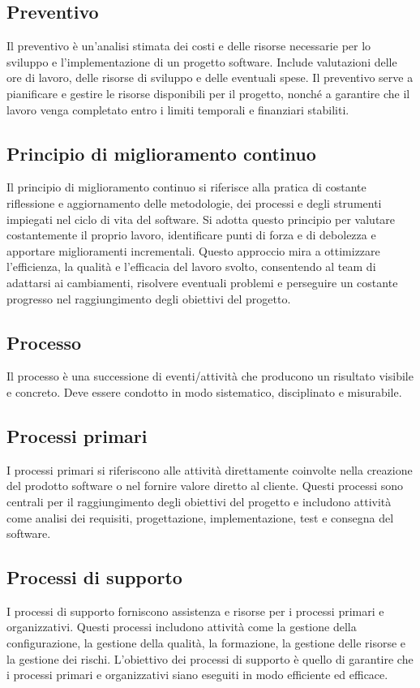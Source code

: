 \subsection*{Preventivo} 
Il preventivo è un'analisi stimata dei costi e delle risorse necessarie per lo sviluppo e l'implementazione di un progetto software. Include valutazioni delle ore di lavoro, delle risorse di sviluppo e delle eventuali spese. Il preventivo serve a pianificare e gestire le risorse disponibili per il progetto, nonché a garantire che il lavoro venga completato entro i limiti temporali e finanziari stabiliti. 
\subsection*{Principio di miglioramento continuo} 
Il principio di miglioramento continuo si riferisce alla pratica di costante riflessione e aggiornamento delle metodologie, dei processi e degli strumenti impiegati nel ciclo di vita del software. Si adotta questo principio per valutare costantemente il proprio lavoro, identificare punti di forza e di debolezza e apportare miglioramenti incrementali. Questo approccio mira a ottimizzare l'efficienza, la qualità e l'efficacia del lavoro svolto, consentendo al team di adattarsi ai cambiamenti, risolvere eventuali problemi e perseguire un costante progresso nel raggiungimento degli obiettivi del progetto. 
\subsection*{Processo} 
Il processo è una successione di eventi/attività che producono un risultato visibile e concreto. Deve essere condotto in modo sistematico, disciplinato e misurabile.
\subsection*{Processi primari} 
I processi primari si riferiscono alle attività direttamente coinvolte nella creazione del prodotto software o nel fornire valore diretto al cliente. Questi processi sono centrali per il raggiungimento degli obiettivi del progetto e includono attività come analisi dei requisiti, progettazione, implementazione, test e consegna del software.
\subsection*{Processi di supporto} 
I processi di supporto forniscono assistenza e risorse per i processi primari e organizzativi. Questi processi includono attività come la gestione della configurazione, la gestione della qualità, la formazione, la gestione delle risorse e la gestione dei rischi. L'obiettivo dei processi di supporto è quello di garantire che i processi primari e organizzativi siano eseguiti in modo efficiente ed efficace.
